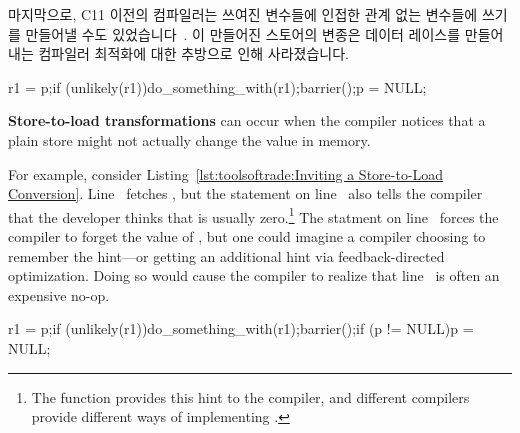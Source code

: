 마지막으로, C11 이전의 컴파일러는 쓰여진 변수들에 인접한 관계 없는 변수들에
쓰기를 만들어낼 수도
있었습니다~\cite[Section 4.2]{Boehm:2005:TCI:1064978.1065042}.
이 만들어진 스토어의 변종은 데이터 레이스를 만들어내는 컴파일러 최적화에 대한
추방으로 인해 사라졌습니다.

\begin{listing}[tbp]
\begin{fcvlabel}
\begin{VerbatimL}[commandchars=\\\[\]]
r1 = p;\lnlbl[load:p]
if (unlikely(r1))\lnlbl[if]
	do_something_with(r1);\lnlbl[dsw]
barrier();\lnlbl[barrier]
p = NULL;\lnlbl[null]
\end{VerbatimL}
\end{fcvlabel}
\caption{Inviting a Store-to-Load Conversion}
\label{lst:toolsoftrade:Inviting a Store-to-Load Conversion}
\end{listing}

{\bf Store-to-load transformations} can occur when the compiler notices
that a plain store might not actually change the value in memory.
\begin{fcvref}
For example, consider
Listing~\ref{lst:toolsoftrade:Inviting a Store-to-Load Conversion}.
Line~ fetches , but the  statement on
line~ also tells the compiler that the developer thinks that
 is usually zero.\footnote{
	The  function provides this hint to the compiler,
	and different compilers provide different ways of implementing
	.}
The  statment on line~ forces the compiler
to forget the value of , but one could imagine a compiler
choosing to remember the hint---or getting an additional hint via
feedback-directed optimization.
Doing so would cause the compiler to realize that line~
is often an expensive no-op.
\end{fcvref}

\begin{listing}[tbp]
\begin{fcvlabel}
\begin{VerbatimL}[commandchars=\\\[\]]
r1 = p;\lnlbl[load:p]
if (unlikely(r1))\lnlbl[if]
	do_something_with(r1);\lnlbl[dsw]
barrier();\lnlbl[barrier]
if (p != NULL)\lnlbl[if1]
	p = NULL;\lnlbl[null]
\end{VerbatimL}
\end{fcvlabel}
\caption{Compiler Converts a Store to a Load}
\label{lst:toolsoftrade:Compiler Converts a Store to a Load}
\end{listing}

